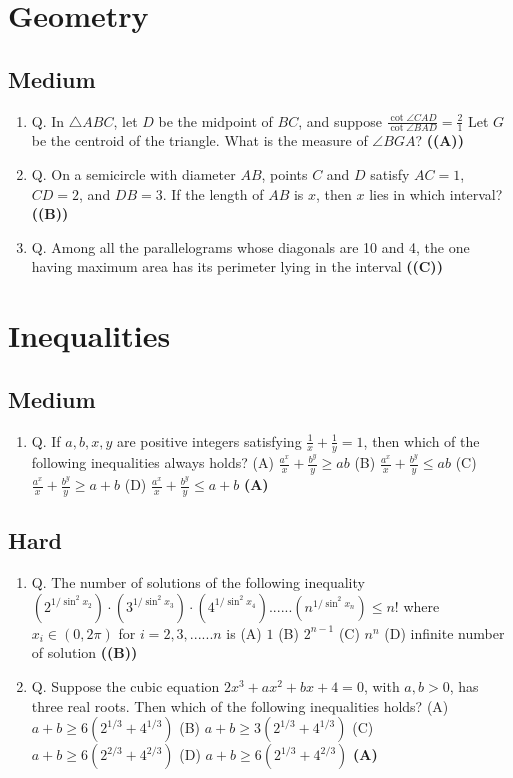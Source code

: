 \documentclass{article}
\begin{document}
\section{Geometry}
\subsection{Medium}
\begin{enumerate}
\item Q. In $\triangle ABC$, let $D$ be the midpoint of $BC$, and suppose
$\frac{\cot \angle CAD}{\cot \angle BAD} = \frac{2}{1}$
Let $G$ be the centroid of the triangle. What is the measure of $\angle BGA$? \hfill \textbf{((A))}
\item Q. On a semicircle with diameter $AB$, points $C$ and $D$ satisfy $AC = 1$, $CD = 2$, and $DB = 3$. If the length of $AB$ is $x$, then $x$ lies in which interval? \hfill \textbf{((B))}
\item Q. Among all the parallelograms whose diagonals are 10 and 4, the one having maximum area has its perimeter lying in the interval \hfill \textbf{((C))}
\end{enumerate}
\section{Inequalities}
\subsection{Medium}
\begin{enumerate}
\item Q. If $a, b, x, y$ are positive integers satisfying
$\frac{1}{x} + \frac{1}{y} = 1$,
then which of the following inequalities always holds?
(A) $\frac{a^x}{x} + \frac{b^y}{y} \geq ab$
(B) $\frac{a^x}{x} + \frac{b^y}{y} \leq ab$
(C) $\frac{a^x}{x} + \frac{b^y}{y} \geq a+b$
(D) $\frac{a^x}{x} + \frac{b^y}{y} \leq a+b$ \hfill \textbf{(A)}
\end{enumerate}
\subsection{Hard}
\begin{enumerate}
\item Q. The number of solutions of the following inequality
$(2^{1/\sin^2x_2}) \cdot (3^{1/\sin^2x_3})\cdot (4^{1/\sin^2x_4}) ...... (n^{1/\sin^2x_n}) \le n!$
where $x_i \in (0, 2\pi)$ for $i = 2, 3, . . . . . . n$ is
(A) $1$
(B) $2^{n-1}$
(C) $n^n$
(D) infinite number of solution \hfill \textbf{((B))}
\item Q. Suppose the cubic equation
$2x^3 + ax^2 + bx + 4 = 0$,
with $a, b > 0$, has three real roots. Then which of the following inequalities holds?
(A) $a+b \geq 6(2^{1/3} + 4^{1/3})$
(B) $a+b \geq 3(2^{1/3} + 4^{1/3})$
(C) $a+b \geq 6(2^{2/3} + 4^{2/3})$
(D) $a+b \geq 6(2^{1/3} + 4^{2/3})$ \hfill \textbf{(A)}
\end{enumerate}
\end{document}
